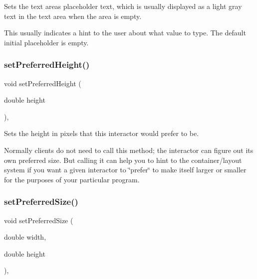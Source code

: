 Sets the text area\textquotesingle{}s placeholder text, which is usually displayed as a light gray text in the text area when the area is empty. 

This usually indicates a hint to the user about what value to type. The default initial placeholder is empty. \mbox{\label{classsgl_1_1GInteractor_a1ab987704fce32098706c6f00fb08218}} 
\subsubsection{\texorpdfstring{set\+Preferred\+Height()}{setPreferredHeight()}}
{\footnotesize\ttfamily void set\+Preferred\+Height (\begin{DoxyParamCaption}\item[{double}]{height }\end{DoxyParamCaption})\hspace{0.3cm}{\ttfamily [virtual]}, {\ttfamily [inherited]}}



Sets the height in pixels that this interactor would prefer to be. 

Normally clients do not need to call this method; the interactor can figure out its own preferred size. But calling it can help you to hint to the container/layout system if you want a given interactor to \char`\"{}prefer\char`\"{} to make itself larger or smaller for the purposes of your particular program. \mbox{\label{classsgl_1_1GInteractor_a042c5ae19430d765ef552371cae3632c}} 
\subsubsection{\texorpdfstring{set\+Preferred\+Size()}{setPreferredSize()}\hspace{0.1cm}{\footnotesize\ttfamily [1/2]}}
{\footnotesize\ttfamily void set\+Preferred\+Size (\begin{DoxyParamCaption}\item[{double}]{width,  }\item[{double}]{height }\end{DoxyParamCaption})\hspace{0.3cm}{\ttfamily [virtual]}, {\ttfamily [inherited]}}



